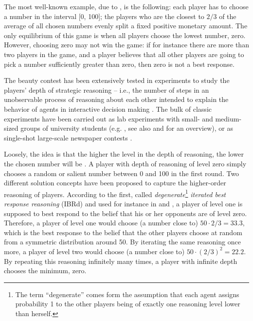 \documentclass[12pt,review]{elsarticle}
\begin{document}
The most well-known example, due to \citet{Moulin86}, is the following:
each player has to choose a number in the interval {[}0, 100{]}; the
players who are the closest to $2/3$ of the average of all chosen
numbers evenly split a fixed positive monetary amount. The only equilibrium
of this game is when all players choose the lowest number, zero. However,
choosing zero may not win the game: if for instance there are more
than two players in the game, and a player believes that all other
players are going to pick a number sufficiently greater than zero,
then zero is not a best response.

The beauty contest has been extensively tested in experiments to study
the players' depth of strategic reasoning -- i.e., the
number of steps in an unobservable process of reasoning about each
other intended to explain the behavior of agents in interactive decision
making \citep{Nagel95,NagelEtAl02,NagelGrosskopf2008,HoCamererWeigelt98,CamererHoChong2004}.
The bulk of classic experiments have been carried out as lab experiments
with small- and medium-sized groups of university students (e.g. \citet{Nagel95,HoCamererWeigelt98},
see also \citet{CamererHoChong2004} and \citet{Nagel08Chapter} for
an overview), or as single-shot large-scale newspaper contests \citep{NagelEtAl02}.

Loosely, the idea is that the higher the level in the depth of reasoning,
the lower the chosen number will be \citep{BURNHAMetAl2009-BCgame}.
A player with depth of reasoning of level zero simply chooses a random
or salient number between 0 and 100 in the first round. Two different
solution concepts have been proposed to capture the higher-order reasoning
of players. According to the first, called \emph{degenerate}\footnote{The term ``degenerate'' comes form the assumption that each agent assigns probability 1 to the other players being of exactly one reasoning
level lower than herself.} \emph{iterated best response reasoning} (IBRd) and used for instance
in \citet{Nagel95} and \citet{NagelEtAl02}, a player of level one
is supposed to best respond to the belief that his or her opponents
are of level zero. Therefore, a player of level one would choose (a
number close to) $50\cdot2/3=33.3$, which is the best response to
the belief that the other players choose at random from a symmetric
distribution around 50. By iterating the same reasoning once more,
a player of level two would choose (a number close to) $50\cdot(2/3)^{2}=22.2$.
By repeating this reasoning infinitely many times, a player with infinite
depth chooses the minimum, zero. 
\end{document}
